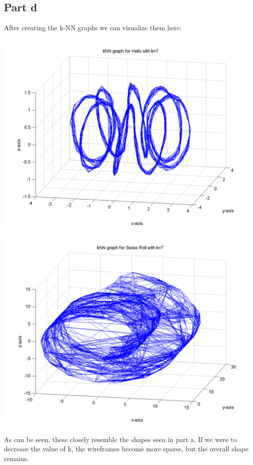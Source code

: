 \documentclass[paper=a4, fontsize=11pt]{scrartcl} %
\numberwithin{equation}{section} %
\numberwithin{figure}{section} %
\numberwithin{table}{section} %
\begin{document}
	\subsection{Part d}
	After creating the k-NN graphs we can visualize them here:
	\\\\
	\hspace*{-3cm}\includegraphics[]{helix_knn}
	\\\\
	\hspace*{-3cm}\includegraphics[]{swiss_knn}
	\\\\
	As can be seen, these closely resemble the shapes seen in part a. If we were to decrease the value of k, the wireframes become more sparse, but the overall shape remains.
\end{document}
